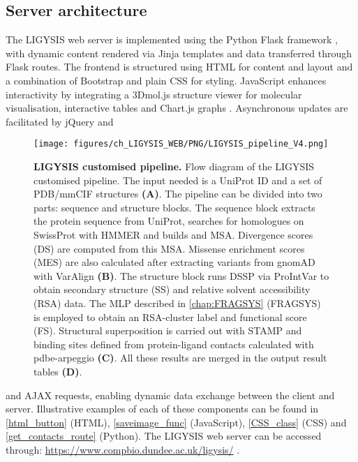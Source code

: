 \subsection{Server architecture}

The LIGYSIS web server is implemented using the Python Flask framework \cite{GRINBERG_2018_FLASK}, with dynamic content rendered via Jinja templates \cite{JINJA} and data transferred through Flask routes. The frontend is structured using HTML for content and layout and a combination of Bootstrap \cite{BOOTSTRAP} and plain CSS \cite{HTML_CSS} for styling. JavaScript \cite{JAVASCRIPT} enhances interactivity by integrating a 3Dmol.js structure viewer \cite{REGO_2014_3DMOL, SESHADRI_2020_3DMOL} for molecular visualisation, interactive tables and Chart.js graphs \cite{CHARTJS}. Asynchronous updates are facilitated by jQuery \cite{jQUERY} and

\begin{figure}[htbp!]
    \centering
    \texttt{[image: figures/ch\_LIGYSIS\_WEB/PNG/LIGYSIS\_pipeline\_V4.png]}
    \caption[LIGYSIS customised pipeline]{\textbf{LIGYSIS customised pipeline.} Flow diagram of the LIGYSIS customised pipeline. The input needed is a UniProt ID and a set of PDB/mmCIF structures \textbf{(A)}. The pipeline can be divided into two parts: sequence and structure blocks. The sequence block extracts the protein sequence from UniProt, searches for homologues on SwissProt with HMMER and builds and MSA. Divergence scores (DS) are computed from this MSA. Missense enrichment scores (MES) are also calculated after extracting variants from gnomAD with VarAlign \textbf{(B)}. The structure block runs DSSP via ProIntVar to obtain secondary structure (SS) and relative solvent accessibility (RSA) data. The MLP described in \autoref{chap:FRAGSYS} (FRAGSYS) is employed to obtain an RSA-cluster label and functional score (FS). Structural superposition is carried out with STAMP and binding sites defined from protein-ligand contacts calculated with pdbe-arpeggio \textbf{(C)}. All these results are merged in the output result tables \textbf{(D)}.}
    \label{fig:ligysis_pipeline}
\end{figure}

\noindent
and AJAX \cite{AJAX} requests, enabling dynamic data exchange between the client and server. Illustrative examples of each of these components can be found in \autoref{html_button} (HTML), \autoref{saveimage_func} (JavaScript), \autoref{CSS_class} (CSS) and \autoref{get_contacts_route} (Python). The LIGYSIS web server can be accessed through: \url{https://www.compbio.dundee.ac.uk/ligysis/} \cite{LIGYSIS_SERVER}.


